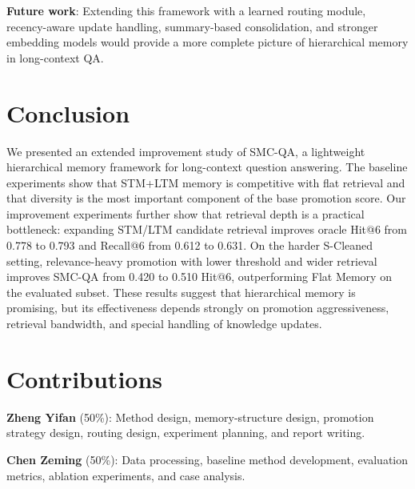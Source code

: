 \documentclass{article}
\begin{document}
\textbf{Future work}: Extending this framework with a learned routing module, recency-aware update handling, summary-based consolidation, and stronger embedding models would provide a more complete picture of hierarchical memory in long-context QA.

\section{Conclusion}

We presented an extended improvement study of SMC-QA, a lightweight hierarchical memory framework for long-context question answering. The baseline experiments show that STM+LTM memory is competitive with flat retrieval and that diversity is the most important component of the base promotion score. Our improvement experiments further show that retrieval depth is a practical bottleneck: expanding STM/LTM candidate retrieval improves oracle Hit@6 from 0.778 to 0.793 and Recall@6 from 0.612 to 0.631. On the harder S-Cleaned setting, relevance-heavy promotion with lower threshold and wider retrieval improves SMC-QA from 0.420 to 0.510 Hit@6, outperforming Flat Memory on the evaluated subset. These results suggest that hierarchical memory is promising, but its effectiveness depends strongly on promotion aggressiveness, retrieval bandwidth, and special handling of knowledge updates.

\section{Contributions}

\textbf{Zheng Yifan} (50\%): Method design, memory-structure design, promotion strategy design, routing design, experiment planning, and report writing.

\textbf{Chen Zeming} (50\%): Data processing, baseline method development, evaluation metrics, ablation experiments, and case analysis.

\clearpage

\end{document}
